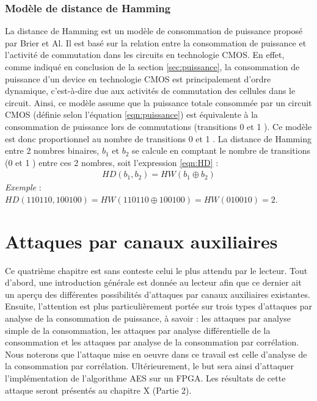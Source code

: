 \documentclass[oneside]{book}
\begin{document}
\subsection{Modèle de distance de Hamming}
\label{sec:modelHD}

La distance de Hamming est un modèle de consommation de puissance proposé par Brier et Al. Il est basé sur la relation entre la consommation de puissance et l'activité de commutation dans les circuits en technologie CMOS. En effet, comme indiqué en conclusion de la section \ref{sec:puissance}, la consommation de puissance d'un device en technologie CMOS est principalement d'ordre dynamique, c'est-à-dire due aux activités de commutation des cellules dans le circuit. Ainsi, ce modèle assume que la puissance totale consommée par un circuit CMOS (définie selon l'équation \ref{eqn:puissance}) est équivalente à la consommation de puissance lors de commutations (transitions 0  et 1 ). Ce modèle est donc proportionnel au nombre de transitions 0  et 1 . La distance de Hamming entre 2 nombres binaires, $b_1$ et $b_2$ se calcule en comptant le nombre de transitions (0  et 1 ) entre ces 2 nombres, soit l'expression \ref{eqn:HD} : 
\begin{gather}
	HD(b_{1},b_{2}) = HW(b_1 \oplus b_2)\label{eqn:HD}
\end{gather}
\textit{Exemple} : $HD(110110,100100) = HW(110110 \oplus 100100) = HW(010010) = 2.$

\newpage


\chapter{Attaques par canaux auxiliaires}
\label{chap:attaques}

Ce quatrième chapitre est sans conteste celui le plus attendu par le lecteur. Tout d'abord, une introduction générale est donnée au lecteur afin que ce dernier ait un aperçu des différentes possibilités d'attaques par canaux auxiliaires existantes. Ensuite, l'attention est plus particulièrement portée sur trois types d'attaques par analyse de la consommation de puissance, à savoir : les attaques par analyse simple de la consommation, les attaques par analyse différentielle de la consommation et les attaques par analyse de la consommation par corrélation. Nous noterons que l'attaque mise en oeuvre dans ce travail est celle d'analyse de la consommation par corrélation. Ultérieurement, le but sera ainsi d'attaquer l'implémentation de l'algorithme AES sur un FPGA. Les résultats de cette attaque seront présentés au chapitre X (Partie 2). 
\end{document}
